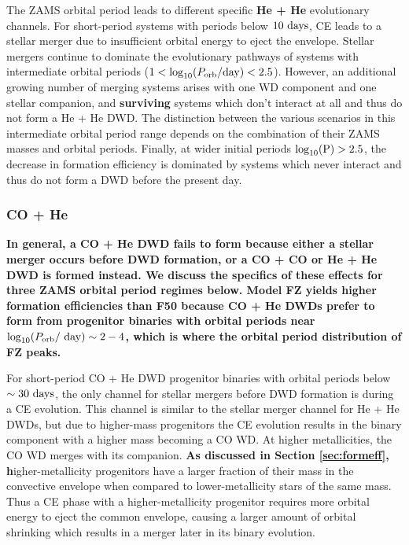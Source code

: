 \documentclass[twocolumn, linenumbers]{aastex631}
\begin{document}
The ZAMS orbital period leads to different specific \textbf{He + He} 
evolutionary channels. For short-period systems with periods below 
$10~\rm{days}$, CE leads to a stellar merger due to insufficient orbital 
energy to eject the envelope. Stellar mergers continue to dominate the 
evolutionary pathways of systems with intermediate orbital periods ($1 < 
\log_{10}(P_{\rm{orb}}/\rm{day}) < 2.5$). However, an additional growing 
number of merging systems arises with one WD component and one stellar 
companion, and \textbf{surviving} systems which don't interact at all and 
thus do not form a He + He DWD. The distinction between the various 
scenarios in this intermediate orbital period range depends on the 
combination of their ZAMS masses and orbital periods. Finally, at wider 
initial periods $\log_{10}(\rm{P}) > 2.5$, the decrease in formation 
efficiency is dominated by systems which never interact and thus do not 
form a DWD before the present day.

\subsubsection{\textbf{CO + He}}\label{formeff_COHe}
\textbf{In general, a CO + He DWD fails to form because either a stellar 
merger occurs before DWD formation, or a CO + CO or He + He DWD is formed 
instead. We discuss the specifics of these effects for three ZAMS orbital 
period regimes below. Model FZ yields higher formation efficiencies than 
F50 because CO + He DWDs prefer to form from progenitor binaries with 
orbital periods near $\log_{10}(P_{\rm{orb}}/~\rm{day})\sim2-4$, which is 
where the orbital period distribution of FZ peaks.}

For short-period CO + He DWD progenitor binaries with orbital periods 
below $\sim30~\rm{days}$, the only channel for stellar mergers before DWD 
formation is during a CE evolution. This channel is similar to the stellar 
merger channel for He + He DWDs, but due to higher-mass progenitors the CE 
evolution results in the binary component with a higher mass becoming a CO 
WD. At higher metallicities, the CO WD merges with its companion. 
\textbf{As discussed in Section \ref{sec:formeff}, h}igher-metallicity 
progenitors have a larger fraction of their mass in the convective 
envelope when compared to lower-metallicity stars of the same mass. Thus a 
CE phase with a higher-metallicity progenitor requires more orbital energy 
to eject the common envelope, causing a larger amount of orbital shrinking 
which results in a merger later in its binary evolution.
\end{document}
